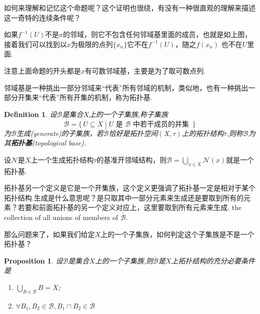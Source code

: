 \documentclass{article}
\newtheorem{proposition}[theorem]{Proposition}
\newtheorem{definition}[theorem]{Definition}
\newcommand\Set[2]{\{\,#1\mid#2\,\}} %
\begin{document}
如何来理解和记忆这个命题呢？这个证明也很绕，有没有一种很直观的理解来描述这一奇特的连续条件呢？

\begin{center}
\end{center}

如果$f^{-1}(U)$不是$x$的邻域，则它不包含任何邻域基里面的成员，也就是如上图，接着我们可以找到以$x$为极限的点列$\{x_n\}$它不在$f^{-1}(U)$，随之$f(x_n)$ 也不在$U$里面.

注意上面命题的开头都是$x$有可数邻域基，主要是为了取可数点列. 

邻域基是一种挑出一部分邻域来“代表”所有邻域的机制，类似地，也有一种挑出一部分开集来“代表”所有开集的机制，称为拓扑基.

\begin{definition}
设$\mathscr{B}$是集合$X$上的一个子集族,称子集族\[\overline{\mathscr{B}}=\Set{U \subseteq X}{U \text{ 是 } \mathscr{B} \text{ 中若干成员的并集 }}\]为$\mathscr{B}$\textsf{生成}(generate)的子集族，若$\bar{\mathscr{B}}$恰好是拓扑空间$(X,\tau)$上的拓扑结构$\tau$,则称$\mathscr{B}$为其\textbf{拓扑基}(topological base).
\end{definition}

设$\mathcal{N}$是$X$上一个生成拓扑结构$\tau$的基准开领域结构，则$\mathscr{B}=\bigcup\limits_{x \in X}\mathcal{N}(x)$就是一个拓扑基.

拓扑基另一个定义是它是一个开集族，这个定义更强调了拓扑基一定是相对于某个拓扑结构.生成是什么意思呢？是只取其中一部分元素来生成还是要取到所有的元素？若要和前面拓扑基的另一个定义对应上，这里要取到所有元素来生成. the collection of all unions of members of $\overline{\mathscr{B}}$.


那么问题来了，如果我们给定$X$上的一个子集族，如何判定这个子集族是不是一个拓扑基？

\begin{proposition}
设$\mathscr{B}$是集合$X$上的一个子集族,则$\overline{\mathscr{B}}$是$X$上拓扑结构的充分必要条件是
\begin{enumerate}
	\item $\bigcup\limits_{B \in \mathscr{B}}B = X$;
	\item $\forall B_1,B_2 \in \mathscr{B},B_1 \cap B_2 \in \overline{\mathscr{B}}$
\end{enumerate}
\end{proposition}
\end{document}
